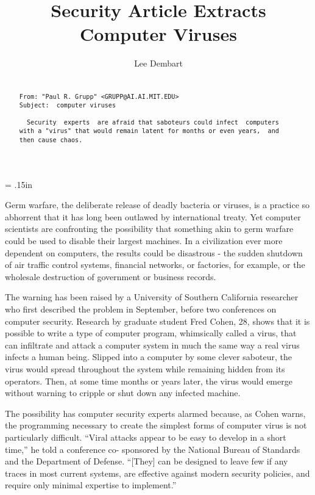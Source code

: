 \setlength{\parindent}{0.0in}
\parskip = .15in
\title{Security Article Extracts \\ {\sf Computer Viruses} }
\author{Lee Dembart}
\date{}


\maketitle
\begin{samepage}
\begin{abstract}
\begin{verbatim}

From: "Paul R. Grupp" <GRUPP@AI.AI.MIT.EDU>
Subject:  computer viruses

  Security  experts  are afraid that saboteurs could infect  computers 
with a "virus" that would remain latent for months or even years,  and 
then cause chaos.
\end{verbatim}
\end{abstract}
\end{samepage}

\newpage

Germ warfare,  the deliberate release of deadly bacteria or viruses, 
is  a  practice  so  abhorrent  that it  has  long  been  outlawed  by 
international  treaty.   Yet computer scientists are  confronting  the 
possibility  that  something  akin to germ warfare could  be  used  to 
disable their largest machines.  In a civilization ever more dependent 
on computers,  the results could be disastrous - the sudden shutdown of 
air  traffic control systems,  financial networks,  or factories,  for 
example,  or  the  wholesale  destruction of  government  or  business 
records.  

  The  warning has been raised by a University of Southern  California 
researcher  who first described the problem in September,  before  two 
conferences  on computer security.  Research by graduate student  Fred 
Cohen,  28,  shows  that  it is possible to write a type  of  computer 
program,  whimsically called a virus, that can infiltrate and attack a 
computer  system  in much the same way a real virus  infects  a  human 
being.  Slipped  into  a computer by some clever saboteur,  the  virus 
would  spread throughout the system  while remaining hidden  from  its 
operators.  Then,  at some time months or years later, the virus would 
emerge without warning to cripple or shut down any infected machine.  

  The  possibility has computer security experts alarmed  because,  as 
Cohen warns, the programming necessary to create the simplest forms of 
computer  virus is not particularly difficult.   ``Viral attacks appear 
to  be  easy  to develop in a short time,'' he told  a  conference  co-
sponsored  by the National Bureau of Standards and the  Department  of 
Defense.   ``[They]  can be designed to leave few if any traces in most 
current systems,  are effective against modern security policies,  and 
require only minimal expertise to implement.'' 


